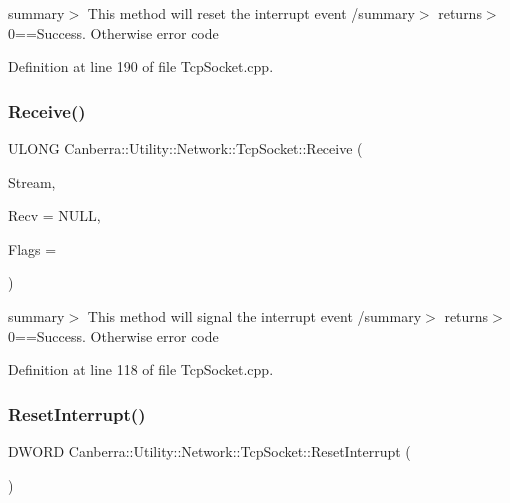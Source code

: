 summary$>$ This method will reset the interrupt event /summary$>$ returns$>$0==Success. Otherwise error code

Definition at line 190 of file Tcp\+Socket.\+cpp.

\mbox{\label{class_canberra_1_1_utility_1_1_network_1_1_tcp_socket_a9b8045e1d4ed56ea0df27956e2e0e025_a9b8045e1d4ed56ea0df27956e2e0e025}} 
\subsubsection{\texorpdfstring{Receive()}{Receive()}}
{\footnotesize\ttfamily U\+L\+O\+NG Canberra\+::\+Utility\+::\+Network\+::\+Tcp\+Socket\+::\+Receive (\begin{DoxyParamCaption}\item[{\hyperlink{class_canberra_1_1_utility_1_1_core_1_1_byte_stream}{Canberra\+::\+Utility\+::\+Core\+::\+Byte\+Stream} \&}]{Stream,  }\item[{U\+L\+O\+NG $\ast$}]{Recv = {\ttfamily NULL},  }\item[{L\+O\+NG}]{Flags = {} }\end{DoxyParamCaption})}

summary$>$ This method will signal the interrupt event /summary$>$ returns$>$0==Success. Otherwise error code

Definition at line 118 of file Tcp\+Socket.\+cpp.

\mbox{\label{class_canberra_1_1_utility_1_1_network_1_1_tcp_socket_a558fbc89e7a2682ef3370bf8d3020764_a558fbc89e7a2682ef3370bf8d3020764}} 
\subsubsection{\texorpdfstring{Reset\+Interrupt()}{ResetInterrupt()}}
{\footnotesize\ttfamily D\+W\+O\+RD Canberra\+::\+Utility\+::\+Network\+::\+Tcp\+Socket\+::\+Reset\+Interrupt (\begin{DoxyParamCaption}{ }\end{DoxyParamCaption})}


